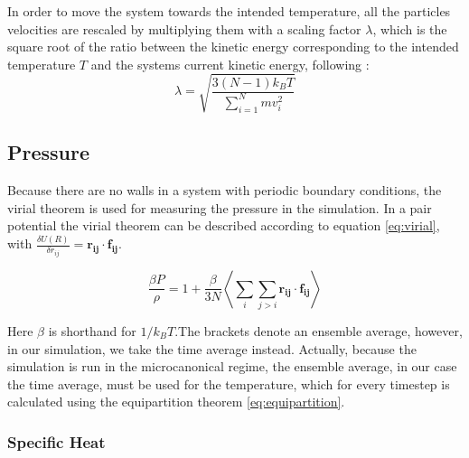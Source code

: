 \documentclass[
10pt, %
a4paper, %
oneside, %
headinclude,footinclude, %
BCOR5mm, %
]{scrartcl}
\begin{document}


In order to move the system towards the intended temperature, all the particles velocities are rescaled by multiplying them with a scaling factor $\lambda$, which is the square root of the ratio between the kinetic energy corresponding to the intended temperature $T$ and the systems current kinetic energy, following \cite{Thijssen:2013cp}:
\begin{equation} 
\lambda = \sqrt{ \frac{3 (N-1) k_BT}{ \sum_{i=1}^N mv_i^2} } 
\end{equation}



\subsection{Pressure}

Because there are no walls in a system with periodic boundary conditions, the virial theorem is used for measuring the pressure in the simulation. In a pair potential the virial theorem can be described according to equation \ref{eq:virial}, with $\frac{\delta U(R)}{\delta r_{ij}} = \mathbf{r_{ij}} \cdot \mathbf{f_{ij}}$. 

\begin{equation} 
\frac{\beta P}{\rho} = 1 + \frac{\beta}{3N} \left \langle \sum_i \sum_{j>i} \mathbf{r_{ij}} \cdot \mathbf{f_{ij}} \right \rangle 
\label{eq:virial}
\end{equation}

Here $\beta$ is shorthand for $1/k_B T$.The brackets denote an ensemble average, however, in our simulation, we take the time average instead. Actually, because the simulation is run in the microcanonical regime, the ensemble average, in our case the time average, must be used for the temperature, which for every timestep is calculated using the equipartition theorem \ref{eq:equipartition}.


\subsubsection{Specific Heat}
\end{document}
